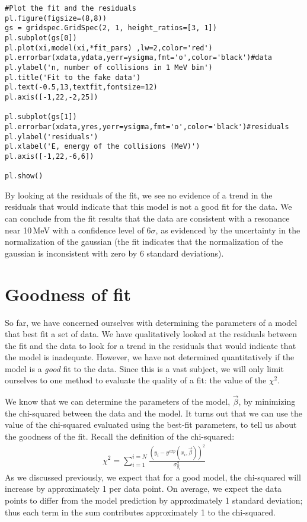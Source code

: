 \begin{lstlisting}[frame=single]
#Plot the fit and the residuals
pl.figure(figsize=(8,8))
gs = gridspec.GridSpec(2, 1, height_ratios=[3, 1])
pl.subplot(gs[0])
pl.plot(xi,model(xi,*fit_pars) ,lw=2,color='red')
pl.errorbar(xdata,ydata,yerr=ysigma,fmt='o',color='black')#data
pl.ylabel('n, number of collisions in 1 MeV bin')
pl.title('Fit to the fake data')
pl.text(-0.5,13,textfit,fontsize=12)
pl.axis([-1,22,-2,25])

pl.subplot(gs[1])
pl.errorbar(xdata,yres,yerr=ysigma,fmt='o',color='black')#residuals
pl.ylabel('residuals')
pl.xlabel('E, energy of the collisions (MeV)')
pl.axis([-1,22,-6,6])

pl.show()
\end{lstlisting}


By looking at the residuals of the fit, we see no evidence of a trend in the residuals that would indicate that this model is not a good fit for the data. We can conclude from the fit results that the data are consistent with a resonance near 10\,MeV with a confidence level of 6$\sigma$, as evidenced by the uncertainty in the normalization of the gaussian (the fit indicates that the normalization of the gaussian is inconsistent with zero by 6 standard deviations).

\section{Goodness of fit}
So far, we have concerned ourselves with determining the parameters of a model that best fit a set of data.  We have qualitatively looked at the residuals between the fit and the data to look for a trend in the residuals that would indicate that the model is inadequate. However, we have not determined quantitatively if the model is a \textit{good} fit to the data. Since this is a vast subject, we will only limit ourselves to one method to evaluate the quality of a fit: the value of the $\chi^2$. 

We know that we can determine the parameters of the model, $\vec\beta$, by minimizing the chi-squared between the data and the model. It turns out that we can use the value of the chi-squared evaluated using the best-fit parameters, to tell us about the goodness of the fit. Recall the definition of the chi-squared:
\begin{align}
\chi^2=\sum_{i=1}^{i=N}\frac{(y_i-y^{exp}(x_i,\vec\beta))^2}{\sigma_{y_i}^2}
\end{align}
As we discussed previously, we expect that for a good model, the chi-squared will increase by approximately 1 per data point. On average, we expect the data points to differ from the model prediction by approximately 1 standard deviation; thus each term in the sum contributes approximately 1 to the chi-squared.

